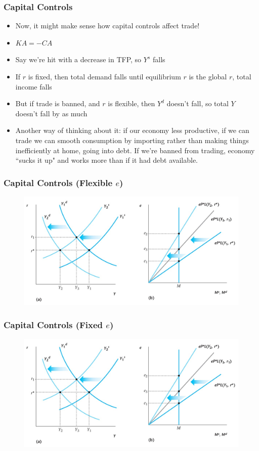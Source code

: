 \documentclass{beamer}
\begin{document}
\begin{frame}
\frametitle[alignment=center]{ Capital Controls}
\begin{itemize}
\item Now, it might make sense how capital controls affect trade!
\bigskip
\item $KA=-CA$
\bigskip
\item Say we're hit with a decrease in TFP, so $Y^s$ falls
\bigskip
\item If $r$ is fixed, then total demand falls until equilibrium $r$ is the global $r$, total income falls
\bigskip
\item But if trade is banned, and $r$ is flexible, then $Y^d$ doesn't fall, so total $Y$ doesn't fall by as much
\bigskip
\item Another way of thinking about it:  if our economy less productive, if we can trade we can smooth consumption by importing rather than making things inefficiently at home, going into debt.  If we're banned from trading, economy ``sucks it up" and works more than if it had debt available.
\end{itemize}
\end{frame}

\begin{frame}
\frametitle[alignment=center]{Capital Controls (Flexible $e$)}
\begin{figure}
\centering
\includegraphics[scale=0.7]{Figures/W_Fig_17pt11.png}
\end{figure}
\end{frame}

\begin{frame}
\frametitle[alignment=center]{Capital Controls (Fixed $e$)}
\begin{figure}
\centering
\includegraphics[scale=0.7]{Figures/W_Fig_17pt11.png}
\end{figure}
\end{frame}
\end{document}
